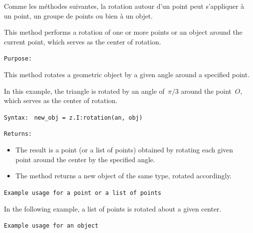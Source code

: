 Comme les méthodes suivantes, la rotation autour d'un point peut s'appliquer à un point, un groupe de points ou bien à un objet.

This method performs a rotation of one or more points or an object around the current point, which serves as the center of rotation.


\medskip
\texttt{Purpose:}

This method rotates a geometric object by a given angle around a specified point.

In this example, the triangle is rotated by an angle of~$\pi/3$ around the point~$O$, which serves as the center of rotation.


\medskip
\texttt{Syntax: } \verb|new_obj = z.I:rotation(an, obj)|


\medskip
\texttt{Returns:}
\begin{itemize}
\item The result is a point (or a list of points) obtained by rotating each given point around the center by the specified angle.
\item The method returns a new object of the same type, rotated accordingly.
\end{itemize}


\medskip
\texttt{Example usage for a point or a list of points}

In the following example, a list of points is rotated about a given center.

\vspace{1em}

\begin{tkzexample}[latex=7cm]
\begin{center}
\end{center}
\end{tkzexample}

\medskip
\texttt{Example usage for an object}

